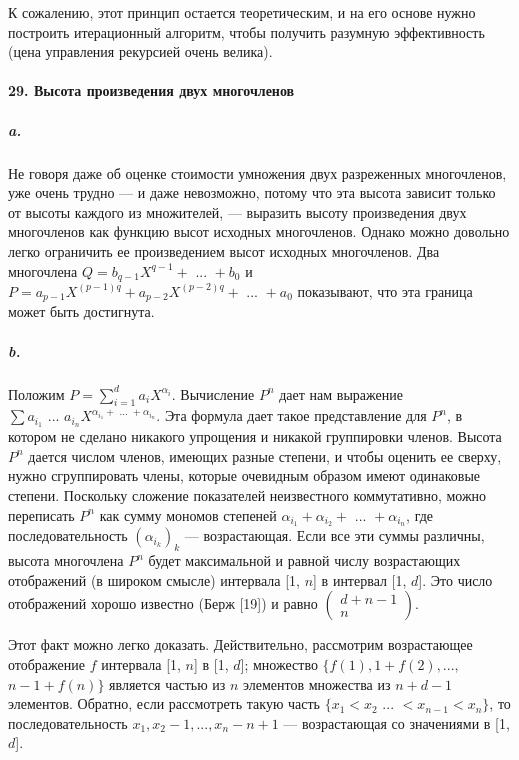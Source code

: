 \documentclass{../../template/mai_book}
\begin{document}
\noindent
К сожалению, этот принцип остается теоретическим, и на его основе нужно построить итерационный алгоритм, чтобы получить разумную эффективность (цена управления рекурсией очень велика).

\newpage


\paragraph{29. Высота произведения двух многочленов}

\subparagraph{a.} Не говоря даже об оценке стоимости умножения двух разреженных многочленов, уже очень трудно — и даже невозможно, потому что эта высота зависит только от высоты каждого из множителей, — выразить высоту произведения двух многочленов как функцию высот исходных многочленов. Однако можно довольно легко ограничить ее произведением высот исходных многочленов. Два многочлена $Q = b_{q - 1}X^{q - 1} + \text{ ... } + b_0$ и $P = a_{p - 1}X^{(p - 1)q} + a_{p - 2}X^{(p - 2)q} + \text{ ... } + a_0$ показывают, что эта граница может быть достигнута.

\subparagraph{b.} Положим $P = {\sum}_{i = 1}^d a_i X^{\alpha_i}$. Вычисление $P^n$ дает нам выражение \linebreak $\sum a_{i_1} \text{ ... } a_{i_n}X^{\alpha_{i_1} + \text{ ... } + \alpha_{i_n}}$. Эта формула дает такое представление для $P^n$, в котором не сделано никакого упрощения и никакой группировки членов. Высота $P^n$ дается числом членов, имеющих разные степени, и чтобы оценить ее сверху, нужно сгруппировать члены, которые очевидным образом имеют одинаковые степени. Поскольку сложение показателей неизвестного коммутативно, можно переписать $P^n$ как сумму мономов степеней $\alpha_{i_1} + \alpha_{i_2} + \text{ ... } + \alpha_{i_n}$, где последовательность $(\alpha_{i_k})_k$ — возрастающая. Если все эти суммы различны, высота многочлена $P^n$ будет максимальной и равной числу возрастающих отображений (в широком смысле) интервала [1, $n$] в интервал [1, $d$]. Это число отображений хорошо известно (Берж [19]) и равно $\left(\begin{array}{c} d + n - 1 \\ n \end{array}\right)$.

Этот факт можно легко доказать. Действительно, рассмотрим возрастающее отображение $f$ интервала [1, $n$] в [1, $d$]; множество $\{f(1), 1 + f(2),...,$ \linebreak $n - 1 + f(n)\}$ является частью из $n$ элементов множества из $n + d - 1$ элементов. Обратно, если рассмотреть такую часть $\{x_1 < x_2 \text{ ... } < x_{n - 1} < x_n\}$, то последовательность $x_1, x_2 - 1,...,x_n - n + 1$ — возрастающая со значениями \linebreak в [1, $d$].
\end{document}
